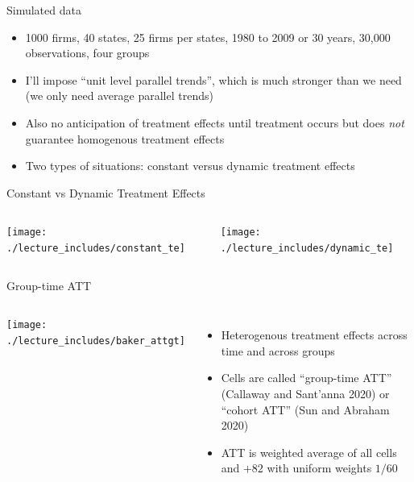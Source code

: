 \documentclass{beamer}
\begin{document}
\begin{frame}{Simulated data}

\begin{itemize}
\item 1000 firms, 40 states, 25 firms per states, 1980 to 2009 or 30 years, 30,000 observations, four groups

\item I'll impose ``unit level parallel trends'', which is much stronger than we need (we only need average parallel trends)

\item Also no anticipation of treatment effects until treatment occurs but does \emph{not} guarantee homogenous treatment effects

\item Two types of situations: constant versus dynamic treatment effects
\end{itemize}
\end{frame}



\begin{frame}{Constant vs Dynamic Treatment Effects}
    \begin{columns}
        \centering
        \texttt{[image: ./lecture\_includes/constant\_te]}

        \centering
        \texttt{[image: ./lecture\_includes/dynamic\_te]}
    \end{columns} 
\end{frame}




\begin{frame}{Group-time ATT}
       \begin{columns}
             \centering
             \texttt{[image: ./lecture\_includes/baker\_attgt]}
		\begin{itemize}
\item Heterogenous treatment effects across time and across groups
\item Cells are called ``group-time ATT'' (Callaway and Sant'anna 2020) or ``cohort ATT'' (Sun and Abraham 2020)
\item ATT is weighted average of all cells and $+82$ with uniform weights $1/60$
		\end{itemize}
         \end{columns} 
    \end{frame}
\end{document}

